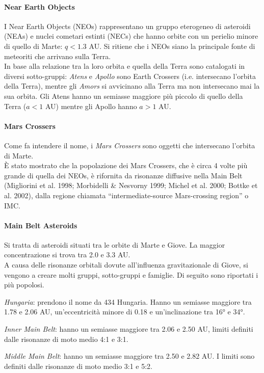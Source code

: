 \documentclass[a4paper,11pt,openright]{book}
\begin{document}
\paragraph*{Near Earth Objects}
I Near Earth Objects (NEOs) rappresentano un gruppo eterogeneo di asteroidi (NEAs) e nuclei cometari estinti (NECs) che hanno orbite con un perielio minore di quello di Marte: $q<1.3$ AU. Si ritiene che i NEOs siano la principale fonte di meteoriti che arrivano sulla Terra.\\
In base alla relazione tra la loro orbita e quella della Terra sono catalogati in diversi sotto-gruppi: \textit{Atens} e \textit{Apollo} sono Earth Crossers (i.e. intersecano l’orbita della Terra), mentre gli \textit{Amors} si avvicinano alla Terra ma non intersecano mai la sua orbita. Gli Atens hanno un semiasse maggiore più piccolo di quello della Terra ($a<1$ AU) mentre gli Apollo hanno $a>1$ AU.

\paragraph*{Mars Crossers}
Come fa intendere il nome, i \textit{Mars Crossers} sono oggetti che intersecano l’orbita di Marte.\\
È stato mostrato che la popolazione dei Mars Crossers, che è circa 4 volte più grande di quella dei NEOs, è rifornita da risonanze diffusive nella Main Belt (Migliorini et al. 1998; Morbidelli \& Nesvorny 1999; Michel et al. 2000; Bottke et al. 2002), dalla regione chiamata “intermediate-source Mars-crossing region” o IMC.

\paragraph*{Main Belt Asteroids}
Si tratta di asteroidi situati tra le orbite di Marte e Giove. La maggior concentrazione si trova tra 2.0 e 3.3 AU.\\
A causa delle risonanze orbitali dovute all’influenza gravitazionale di Giove, si vengono a creare molti gruppi, sotto-gruppi e famiglie. Di seguito sono riportati i più popolosi.

\textit{Hungaria}: prendono il nome da 434 Hungaria. Hanno un semiasse maggiore tra 1.78 e 2.06 AU, un’eccentricità minore di 0.18 e un’inclinazione tra 16° e 34°. 

\textit{Inner Main Belt}: hanno un semiasse maggiore tra 2.06 e 2.50 AU, limiti definiti dalle risonanze di moto medio 4:1 e 3:1.

\textit{Middle Main Belt}: hanno un semiasse maggiore tra 2.50 e 2.82 AU. I limiti sono definiti dalle risonanze di moto medio 3:1 e 5:2.
\end{document}
